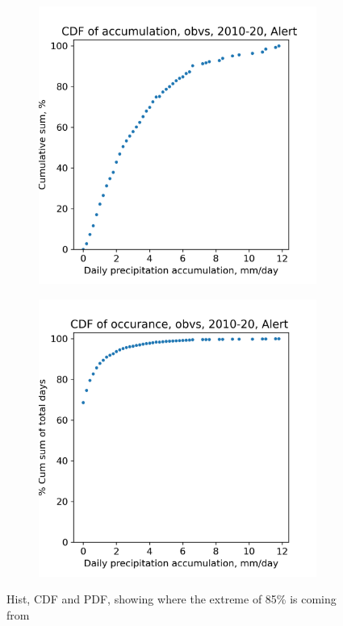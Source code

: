 \documentclass[draft]{agujournal2019}
\begin{document}
\begin{figure}[h!tbp]
    \begin{subfigure}{0.45\linewidth}
        \includegraphics[width=\linewidth]{figures/cdf_pdf/cdf_accum_alert_10_20.png}
    \caption{}
    \end{subfigure}
\hfil
    \begin{subfigure}{0.45\linewidth}
        \includegraphics[width=\linewidth]{figures/cdf_pdf/cdf_occurance_alert_10_20.png}
    \caption{}
    \end{subfigure}
\caption{Hist, CDF and PDF, showing where the extreme of 85\% is coming from}
    \label{fig:my figure}
    \end{figure}
\end{document}
